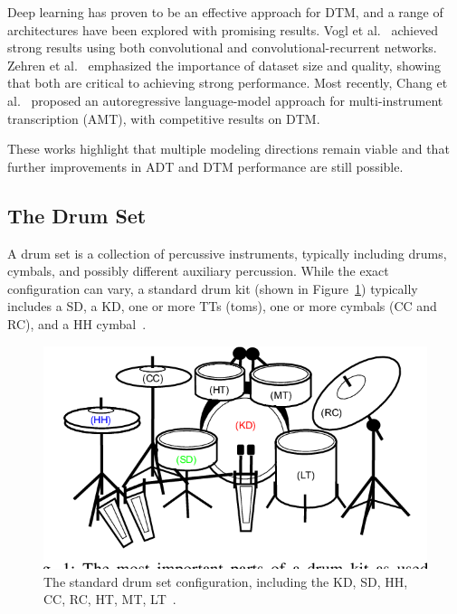 Deep learning has proven to be an effective approach for \gls{DTM}, and a range of architectures have been explored with promising results. Vogl et al.~\cite{Vogl2017DrumTV, vogl2018multiinstrumentdrumtranscription} achieved strong results using both convolutional and convolutional-recurrent networks. Zehren et al.~\cite{signals4040042, zehren2024analyzingreducingsynthetictorealtransfer} emphasized the importance of dataset size and quality, showing that both are critical to achieving strong performance. Most recently, Chang et al.~\cite{chang2024yourmt3+} proposed an autoregressive language-model approach for multi-instrument transcription (\gls{AMT}), with competitive results on \gls{DTM}.

These works highlight that multiple modeling directions remain viable and that further improvements in \gls{ADT} and \gls{DTM} performance are still possible.

\subsection{The Drum Set}

A drum set is a collection of percussive instruments, typically including drums, cymbals, and possibly different auxiliary percussion. While the exact configuration can vary, a standard drum kit (shown in Figure~\ref{DrumsetFigure}) typically includes a \gls{SD}, a \acrfull{KD}, one or more \glspl{TT} (toms), one or more cymbals (\gls{CC} and \gls{RC}), and a \gls{HH} cymbal~\cite{TheDrumHandbook2003}.

\begin{figure}[H]
    \centering
    \includegraphics[scale=0.7, trim={0 1cm 0 0},clip]{figures/drumset}
    \caption{The standard drum set configuration, including the \acrfull{KD}, \acrfull{SD}, \acrfull{HH}, \acrfull{CC}, \acrfull{RC}, \acrfull{HT}, \acrfull{MT}, \acrfull{LT}~\cite{8350302}.}
    \label{DrumsetFigure}
\end{figure}


